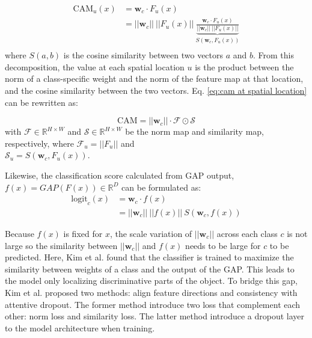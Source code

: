 \documentclass[conference]{IEEEtran}
\begin{document}
\begin{equation} \label{eq:cam at spatial location}
    \begin{split}
        \text{CAM}_u(x) & = \mathbf{w}_c \cdot F_u(x)                                                                                                                \\
                        & = ||\mathbf{w}_c|| ~ || F_u(x) || ~ \underbrace{\frac{\mathbf{w}_c \cdot F_u(x)}{||\mathbf{w}_c|| ~ ||F_u(x)||}}_{S(\mathbf{w}_c, F_u(x))} \\
    \end{split}
\end{equation}
where $S(a, b)$ is the cosine similarity between two vectors $a$ and $b$. From this decomposition, the value at each spatial location $u$ is the product between the norm of a class-specific weight and the norm of the feature map at that location, and the cosine similarity between the two vectors. Eq. \ref{eq:cam at spatial location} can be rewritten as:

\begin{equation} \label{eq:cam with norm and similarity}
    \text{CAM} = ||\mathbf{w}_c|| \cdot \mathcal{F} \odot \mathcal{S}
\end{equation}
with $\mathcal{F} \in \mathbb{R}^{H\times W}$ and $\mathcal{S} \in \mathbb{R}^{H\times W}$ be the norm map and similarity map, respectively, where $\mathcal{F}_u = ||F_u||$ and \\ $\mathcal{S}_u = S(\mathbf{w}_c, F_u(x))$.

Likewise, the classification score calculated from GAP output, $f(x) = GAP(F(x)) \in \mathbb{R}^D$ can be formulated as:
\begin{equation} \label{eq:logit with norm and similarity}
    \begin{split}
        \text{logit}_c(x) & = \mathbf{w}_c \cdot f(x)                             \\
                          & = ||\mathbf{w}_c|| ~ ||f(x)|| ~ S(\mathbf{w}_c, f(x))
    \end{split}
\end{equation}

Because $f(x)$ is fixed for $x$, the scale variation of $||\mathbf{w}_c||$ across each class $c$ is not large so the similarity between $||\mathbf{w}_c||$ and $f(x)$ needs to be large for $c$ to be predicted. Here, Kim et al. found that the classifier is trained to maximize the similarity between weights of a class and the output of the GAP. This leads to the model only localizing discriminative parts of the object. To bridge this gap, Kim et al. proposed two methods: align feature directions and consistency with attentive dropout. The former method introduce two loss that complement each other: norm loss and similarity loss. The latter method introduce a dropout layer to the model architecture when training.
\end{document}
